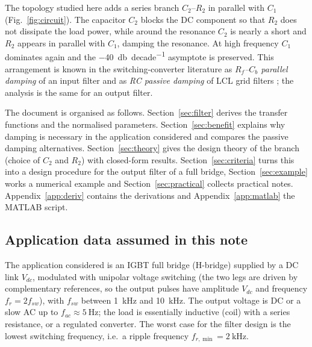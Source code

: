 \documentclass[11pt,a4paper]{article}
\begin{document}
The topology studied here adds a series branch $C_2$--$R_2$ in parallel with $C_1$
(Fig.~\ref{fig:circuit}). The capacitor $C_2$ blocks the DC component so that $R_2$ does
not dissipate the load power, while around the resonance $C_2$ is nearly a short and
$R_2$ appears in parallel with $C_1$, damping the resonance. At high frequency $C_1$
dominates again and the \SI{-40}{\decibel\per decade} asymptote is preserved. This
arrangement is known in the switching-converter literature as \emph{$R_f$--$C_b$ parallel
damping} of an input filter \cite{Middlebrook1978,Phelps1979,Erickson1999,EricksonBook} and as
\emph{RC passive damping} of LCL grid filters \cite{Liserre2005,PenaAlzola2013,Wu2013}; the
analysis is the same for an output filter.

The document is organised as follows. Section~\ref{sec:filter} derives the transfer
functions and the normalised parameters. Section~\ref{sec:benefit} explains why damping is
necessary in the application considered and compares the passive damping alternatives.
Section~\ref{sec:theory} gives the design theory of the branch (choice of $C_2$ and $R_2$)
with closed-form results. Section~\ref{sec:criteria} turns this into a design procedure
for the output filter of a full bridge, Section~\ref{sec:example} works a numerical
example and Section~\ref{sec:practical} collects practical notes. Appendix~\ref{app:deriv}
contains the derivations and Appendix~\ref{app:matlab} the MATLAB script.

\subsection{Application data assumed in this note}
\label{sec:appdata}

The application considered is an IGBT full bridge (H-bridge) supplied by a DC link
$V_{dc}$, modulated with unipolar voltage switching (the two legs are driven by
complementary references, so the output pulses have amplitude $V_{dc}$ and frequency
$f_r = 2 f_{sw}$), with $f_{sw}$ between \SI{1}{\kilo\hertz} and \SI{10}{\kilo\hertz}.
The output voltage is DC or a slow AC up to $f_{ac} \approx \SI{5}{\hertz}$; the
load is essentially inductive (coil) with a series resistance, or a regulated converter.
The worst case for the filter design is the lowest switching frequency, i.e.\ a ripple
frequency $f_{r,\min} = \SI{2}{\kilo\hertz}$.
\end{document}

